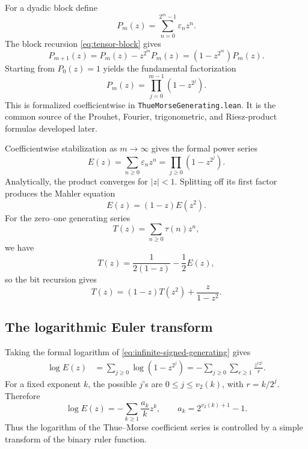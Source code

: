 \documentclass[11pt,oneside]{article}
\theoremstyle{definition}
\theoremstyle{remark}
\newcommand{\vtwo}{v_2}
\newcommand{\eps}{\varepsilon}
\newcommand{\lean}[1]{%
  \ifmmode\text{\nolinkurl{#1}}\else\nolinkurl{#1}\fi}
\begin{document}
For a dyadic block define
\begin{equation}
  P_m(z)=\sum_{n=0}^{2^m-1}\eps_nz^n.
  \label{eq:Pm-definition}
\end{equation}
The block recursion \eqref{eq:tensor-block} gives
\begin{equation}
  P_{m+1}(z)=P_m(z)-z^{2^m}P_m(z)
            =(1-z^{2^m})P_m(z).
  \label{eq:Pm-recursion}
\end{equation}
Starting from \(P_0(z)=1\) yields the fundamental factorization
\begin{equation}
  \boxed{
  P_m(z)=\prod_{j=0}^{m-1}(1-z^{2^j}).}
  \label{eq:finite-generating-product}
\end{equation}
This is formalized coefficientwise in \lean{ThueMorseGenerating.lean}.  It is
the common source of the Prouhet, Fourier, trigonometric, and Riesz-product
formulas developed later.

Coefficientwise stabilization as \(m\to\infty\) gives the formal power series
\begin{equation}
  E(z)=\sum_{n\ge0}\eps_nz^n
      =\prod_{j\ge0}(1-z^{2^j}).
  \label{eq:infinite-signed-generating}
\end{equation}
Analytically, the product converges for \(|z|<1\).  Splitting off its first
factor produces the Mahler equation
\begin{equation}
  \boxed{E(z)=(1-z)E(z^2).}
  \label{eq:E-Mahler}
\end{equation}
For the zero--one generating series
\begin{equation}
  T(z)=\sum_{n\ge0}\tau(n)z^n,
  \label{eq:T-definition}
\end{equation}
we have
\begin{equation}
  T(z)=\frac{1}{2(1-z)}-\frac12E(z),
  \label{eq:T-from-E}
\end{equation}
so the bit recursion gives
\begin{equation}
  \boxed{
  T(z)=(1-z)T(z^2)+\frac{z}{1-z^2}.}
  \label{eq:T-Mahler}
\end{equation}

\subsection{The logarithmic Euler transform}
\label{sec:euler-transform}

Taking the formal logarithm of \eqref{eq:infinite-signed-generating} gives
\begin{align}
  \log E(z)
   &=\sum_{j\ge0}\log(1-z^{2^j})
    =-\sum_{j\ge0}\sum_{r\ge1}\frac{z^{r2^j}}r.
  \label{eq:logE-double}
\end{align}
For a fixed exponent \(k\), the possible \(j\)'s are
\(0\le j\le\vtwo(k)\), with \(r=k/2^j\).  Therefore
\begin{equation}
  \boxed{
  \log E(z)=-\sum_{k\ge1}\frac{a_k}{k}z^k,
  \qquad
  a_k=2^{\vtwo(k)+1}-1.}
  \label{eq:logE-ruler}
\end{equation}
Thus the logarithm of the Thue--Morse coefficient series is controlled by a
simple transform of the binary ruler function.
\end{document}
